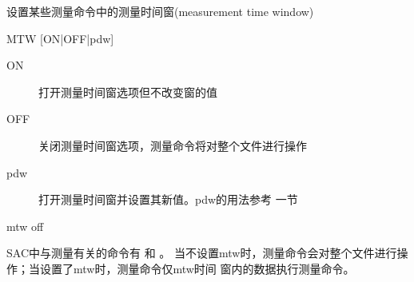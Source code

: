 \label{cmd:mtw}

设置某些测量命令中的测量时间窗(measurement time window)

\begin{SACSTX}
MTW [ON|OFF|pdw]
\end{SACSTX}

\begin{description}
\item [ON] 打开测量时间窗选项但不改变窗的值
\item [OFF] 关闭测量时间窗选项，测量命令将对整个文件进行操作
\item [pdw] 打开测量时间窗并设置其新值。pdw的用法参考  一节
\end{description}

\begin{SACDFT}
mtw off
\end{SACDFT}

SAC中与测量有关的命令有  和 。
当不设置mtw时，测量命令会对整个文件进行操作；当设置了mtw时，测量命令仅mtw时间
窗内的数据执行测量命令。
